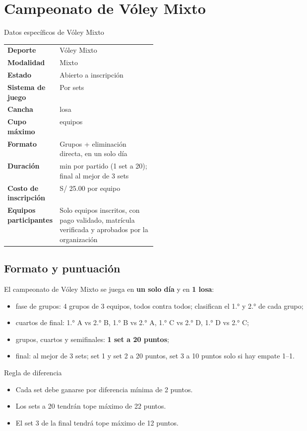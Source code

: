 \documentclass[12pt,a4paper]{article}
\newcommand{\datoTabla}[2]{%
	\textbf{\textcolor{imegreenDark}{#1}} & #2\\[0.35em]
}
\begin{document}
	\section{Campeonato de Vóley Mixto}
	
	\begin{cajaResumen}{Datos específicos de Vóley Mixto}
		\renewcommand{\arraystretch}{1.25}
		\begin{tabularx}{\linewidth}{
				>{\RaggedRight\arraybackslash}p{0.35\linewidth}
				>{\RaggedRight\arraybackslash}X
			}
			\datoTabla{Deporte}{Vóley Mixto}
			\datoTabla{Modalidad}{Mixto}
			\datoTabla{Estado}{Abierto a inscripción}
			\datoTabla{Sistema de juego}{Por sets}
			\datoTabla{Cancha}{1 losa}
			\datoTabla{Cupo máximo}{12 equipos}
			\datoTabla{Formato}{Grupos + eliminación directa, en un solo día}
			\datoTabla{Duración}{25 min por partido (1 set a 20); final al mejor de 3 sets}
			\datoTabla{Costo de inscripción}{S/ 25.00 por equipo}
			\datoTabla{Equipos participantes}{Solo equipos inscritos, con pago validado, matrícula verificada y aprobados por la organización}
		\end{tabularx}
	\end{cajaResumen}
	
	\subsection{Formato y puntuación}
	
	El campeonato de Vóley Mixto se juega en \textbf{un solo día} y en \textbf{1 losa}:
	
	\begin{itemize}
		\item fase de grupos: 4 grupos de 3 equipos, todos contra todos; clasifican el 1.° y 2.° de cada grupo;
		\item cuartos de final: 1.° A vs 2.° B, 1.° B vs 2.° A, 1.° C vs 2.° D, 1.° D vs 2.° C;
		\item grupos, cuartos y semifinales: \textbf{1 set a 20 puntos};
		\item final: al mejor de 3 sets; set 1 y set 2 a 20 puntos, set 3 a 10 puntos solo si hay empate 1--1.
	\end{itemize}
	
	\begin{cajaAdvertencia}{Regla de diferencia}
		\begin{itemize}
			\item Cada set debe ganarse por diferencia mínima de 2 puntos.
			\item Los sets a 20 tendrán tope máximo de 22 puntos.
			\item El set 3 de la final tendrá tope máximo de 12 puntos.
		\end{itemize}
	\end{cajaAdvertencia}
	
\end{document}
